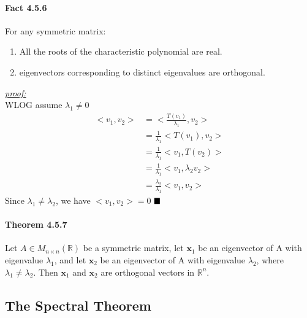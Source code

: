 \documentclass[11pt]{article}
\newcommand{\tb}[1]{\textbf{#1}}
\newcommand{\proof}[0]{\textit{\underline{proof:} }}
\newcommand{\qed}[0]{$\hfill\blacksquare$}
\newcommand{\real}[0]{\mathbb{R}}
\newcommand{\vx}[0]{\tb{x}}
\begin{document}
{\paragraph{Fact 4.5.6} For any symmetric matrix:
\begin{enumerate}
	\item All the roots of the characteristic polynomial are real.
	\item eigenvectors corresponding to distinct eigenvalues are orthogonal.
\end{enumerate}
\proof \\
WLOG assume $\lambda_1 \neq 0$
\begin{align*}
	<v_1,v_2> &= <\frac{T(v_1)}{\lambda_1},v_2> \\
	&= \frac{1}{\lambda_1}<T(v_1),v_2> \\
	&= \frac{1}{\lambda_1}<v_1,T(v_2)> \\
	&= \frac{1}{\lambda_1}<v_1,\lambda_2v_2> \\
	&= \frac{\lambda_2}{\lambda_1}<v_1,v_2>  
\end{align*}
Since $\lambda_1 \neq \lambda_2$, we have $<v_1,v_2> = 0$
\qed
\paragraph{Theorem 4.5.7} Let $A \in M_{n\times n}(\real)$ be a symmetric matrix, let $\vx_1$ be an eigenvector of A with eigenvalue $\lambda_1$, and let $\vx_2$ be an eigenvector of A with eigenvalue $\lambda_2$, where $\lambda_1 \neq \lambda_2$. Then $\vx_1$ and $\vx_2$ are orthogonal vectors in $\real^n$. 
\subsection{The Spectral Theorem}
}
\end{document}
